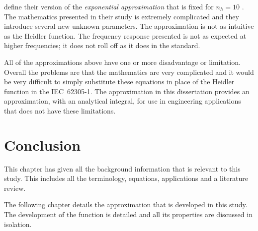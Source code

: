 \citeauthor{Vujevic2009} define their version of the \textit{exponential approximation} that is fixed for $n_h=10$ \cite{Vujevic2009,Vujevic2010a}. The mathematics presented in their study is extremely complicated and they introduce several new unknown parameters. The approximation is not as intuitive as the Heidler function. The frequency response presented is not as expected at higher frequencies; it does not roll off as it does in the standard.

All of the approximations above have one or more disadvantage or limitation. Overall the problems are that the mathematics are very complicated and it would be very difficult to simply substitute these equations in place of the Heidler function in the IEC~62305-1. The approximation in this dissertation provides an approximation, with an analytical integral, for use in engineering applications that does not have these limitations.


\section{Conclusion}
\label{sec:background_conclusion}
This chapter has given all the background information that is relevant to this study. This includes all the terminology, equations, applications and a literature review.

The following chapter details the approximation that is developed in this study. The development of the function is detailed and all its properties are discussed in isolation.
